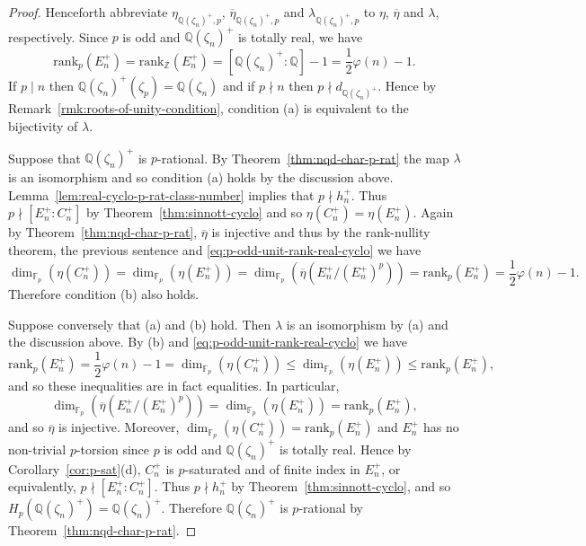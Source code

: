 \documentclass[12pt, a4paper, usenames]{amsart}
\newcommand{\Z}{\mathbb{Z}}
\newcommand{\Q}{\mathbb{Q}}
\newcommand{\F}{\mathbb{F}}
\theoremstyle{plain}
\theoremstyle{remark}
\theoremstyle{definition}
\newcommand{\rank}{\mathrm{rank}}
\begin{document}
\begin{proof}
Henceforth abbreviate $\eta_{\Q(\zeta_{n})^{+},p}$, $\overline{\eta}_{\Q(\zeta_{n})^{+},p}$
and $\lambda_{\Q(\zeta_{n})^{+},p}$ to 
$\eta$, $\overline{\eta}$ and $\lambda$,
respectively.
Since $p$ is odd and $\Q(\zeta_{n})^{+}$ is totally real, we have
\begin{equation}\label{eq:p-odd-unit-rank-real-cyclo}
\rank_{p}(E_{n}^{+}) 
= \rank_{\Z}(E_{n}^{+})
= [\Q(\zeta_{n})^{+}:\Q] -1 
= \textstyle{\frac{1}{2}}\varphi(n)-1.
\end{equation}
If $p \mid n$ then $\Q(\zeta_{n})^{+}(\zeta_{p})=\Q(\zeta_{n})$ and if $p \nmid n$ then
$p \nmid d_{\Q(\zeta_{n})^{+}}$. Hence by Remark~\ref{rmk:roots-of-unity-condition}, 
condition 
(a) is equivalent to the bijectivity of $\lambda$.

Suppose that $\Q(\zeta_{n})^{+}$ is $p$-rational. 
By Theorem~\ref{thm:nqd-char-p-rat} 
the map $\lambda$ is an isomorphism and so condition (a) holds
by the discussion above.
Lemma~\ref{lem:real-cyclo-p-rat-class-number} implies that $p \nmid h_{n}^{+}$.
Thus $p \nmid [E_{n}^{+} : C_{n}^{+}]$ by Theorem~\ref{thm:sinnott-cyclo} and
so $\eta(C_{n}^{+}) = \eta(E_{n}^{+})$.
Again by Theorem~\ref{thm:nqd-char-p-rat}, $\overline{\eta}$ is injective
and thus by the rank-nullity theorem, the previous sentence and \eqref{eq:p-odd-unit-rank-real-cyclo} we have 
\[
\dim_{\F_{p}}(\eta(C_{n}^{+}))
=
\dim_{\F_{p}}(\eta(E_{n}^{+}))
=
\dim_{\F_{p}}(\overline{\eta}(E_{n}^{+}/(E_{n}^{+})^{p}))
=
\rank_{p}(E_{n}^{+})
= 
\textstyle{\frac{1}{2}}\varphi(n)-1.
\]
Therefore condition (b) also holds.

Suppose conversely that (a) and (b) hold. 
Then $\lambda$ is an isomorphism by (a) and the discussion above.
By (b) and \eqref{eq:p-odd-unit-rank-real-cyclo} we have
\[
\rank_{p}(E_{n}^{+})
=
\textstyle{\frac{1}{2}}\varphi(n)-1
= 
\dim_{\F_{p}}(\eta(C_{n}^{+}))
\leq 
\dim_{\F_{p}}(\eta(E_{n}^{+})) 
\leq 
\rank_{p}(E_{n}^{+}),
\]
and so these inequalities are in fact equalities. 
In particular, 
\[
\dim_{\F_{p}}(\overline{\eta}(E_{n}^{+}/(E_{n}^{+})^{p})) 
= \dim_{\F_{p}}(\eta(E_{n}^{+}))
=\rank_{p}(E_{n}^{+}),
\]
and so $\overline{\eta}$ is injective.
Moreover, 
$\dim_{\F_{p}}(\eta(C_{n}^{+}))=\rank_{p}(E_{n}^{+})$
and $E_{n}^{+}$ has no non-trivial $p$-torsion since $p$ is odd and $\Q(\zeta_{n})^{+}$
is totally real. Hence by Corollary~\ref{cor:p-sat}(d), 
$C_{n}^{+}$ is $p$-saturated and of finite index in $E_{n}^{+}$, 
or equivalently, $p \nmid [E_{n}^{+}:C_{n}^{+}]$.
Thus $p \nmid h_{n}^{+}$ by Theorem~\ref{thm:sinnott-cyclo},
and so $H_{p}(\Q(\zeta_{n})^{+})=\Q(\zeta_{n})^{+}$.
Therefore $\Q(\zeta_{n})^{+}$ is $p$-rational by Theorem~\ref{thm:nqd-char-p-rat}.
\end{proof}
\end{document}
